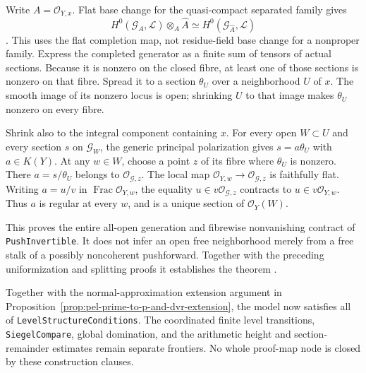 Write $A=\mathcal O_{Y,x}$.  Flat base change for the
quasi-compact separated family gives
\[
 H^0(\mathcal G_A,\mathscr L)\otimes_A\widehat A
       \simeq H^0(\mathcal G_{\widehat A},\mathscr L)
\]
\cite[Tag 02KH]{integral-theta-stacks}.  This uses the flat
completion map, not residue-field base change for a nonproper
family.  Express the completed generator as a finite sum of tensors
of actual sections.  Because it is nonzero on the closed fibre,
at least one of those sections is nonzero on that fibre.
Spread it to a section $\theta_U$ over a neighborhood $U$ of $x$.
The smooth image of its nonzero locus is open; shrinking $U$ to
that image makes $\theta_U$ nonzero on every fibre.

Shrink also to the integral component containing $x$.
For every open $W\subset U$ and every section $s$ on
$\mathcal G_W$, the generic principal polarization gives
$s=a\theta_U$ with $a\in K(Y)$.  At any $w\in W$, choose a
point $z$ of its fibre where $\theta_U$ is nonzero.  There
$a=s/\theta_U$ belongs to $\mathcal O_{\mathcal G,z}$.
The local map
$\mathcal O_{Y,w}\to\mathcal O_{\mathcal G,z}$ is faithfully
flat.  Writing $a=u/v$ in $\operatorname{Frac}\mathcal O_{Y,w}$,
the equality $u\in v\mathcal O_{\mathcal G,z}$ contracts to
$u\in v\mathcal O_{Y,w}$.  Thus $a$ is regular at every $w$,
and is a unique section of $\mathcal O_Y(W)$.

This proves the entire all-open generation and fibrewise
nonvanishing contract of \texttt{PushInvertible}.  It does not
infer an open free neighborhood merely from a free stalk of a
possibly noncoherent pushforward.  Together with the preceding
uniformization and splitting proofs it establishes the theorem
\cite{integral-theta-source}.

Together with the normal-approximation extension argument in
Proposition~\ref{prop:pel-prime-to-p-and-dvr-extension}, the model
now satisfies all of \texttt{LevelStructureConditions}.
The coordinated finite level transitions, \texttt{SiegelCompare},
global domination, and the arithmetic height and section-remainder
estimates remain separate frontiers.  No whole proof-map node is
closed by these construction clauses.
